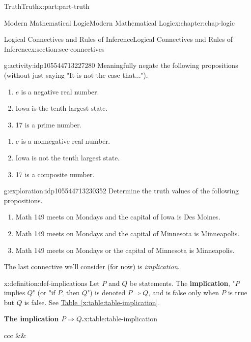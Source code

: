 \documentclass[oneside,10pt,]{book}
\newcommand{\tabularfont}{\relax}
\newcommand{\xreffont}{\relax}
\newcommand{\terminology}[1]{\textbf{#1}}
\numberwithin{equation}{section}
\newcommand{\hrulemedium}{\noalign{\hrule height 0.07em}}
\begin{document}
\begin{partptx}{Truth}{}{Truth}{}{}{x:part:part-truth}
\begin{chapterptx}{Modern Mathematical Logic}{}{Modern Mathematical Logic}{}{}{x:chapter:chap-logic}
\begin{sectionptx}{Logical Connectives and Rules of Inference}{}{Logical Connectives and Rules of Inference}{}{}{x:section:sec-connectives}
\begin{activity}{}{g:activity:idp105544713227280}%
Meaningfully negate the following propositions (without just saying "It is not the case that...").%
%
\begin{enumerate}
\item{}\(e\) is a negative real number.%
\item{}Iowa is the tenth largest state.%
\item{}17 is a prime number.%
\end{enumerate}
\par\smallskip%
\noindent%
\begin{enumerate}
\item{}\(e\) is a nonnegative real number.%
\item{}Iowa is not the tenth largest state.%
\item{}17 is a composite number.%
\end{enumerate}
\end{activity}%
\begin{exploration}{}{g:exploration:idp105544713230352}%
Determine the truth values of the following propositions.%
%
\begin{enumerate}
\item{}Math 149 meets on Mondays and the capital of Iowa is Des Moines.%
\item{}Math 149 meets on Mondays and the capital of Minnesota is Minneapolis.%
\item{}Math 149 meets on Mondays or the capital of Minnesota is Minneapolis.%
\end{enumerate}
\end{exploration}%
The last connective we'll consider (for now) is \emph{implication}.%
\begin{definition}{}{x:definition:def-implications}%
%
%
%
%
Let \(P\) and \(Q\) be statements. The \terminology{implication}, "\(P\) implies \(Q\)" (or "if \(P\), then \(Q\)") is denoted \(P\Rightarrow Q\), and is false only when \(P\) is true but \(Q\) is false. See \hyperref[x:table:table-implication]{Table~{\xreffont\ref{x:table:table-implication}}}.%
\begin{tableptx}{\textbf{The implication \(P\Rightarrow Q\).}}{x:table:table-implication}{}%
\centering%
{\tabularfont%
\begin{tabular}{ccc}
&&\tabularnewline\hrulemedium

\end{tabular}}
\end{tableptx}
\end{definition}
\end{sectionptx}
\end{chapterptx}
\end{partptx}
\end{document}

